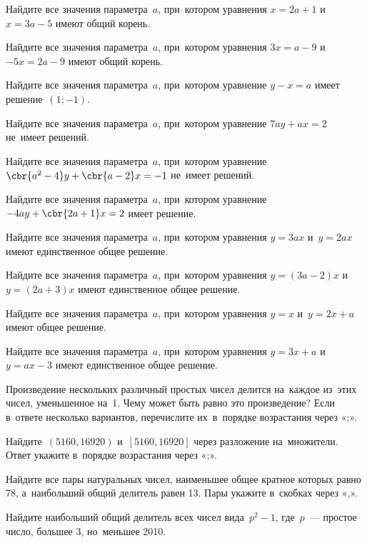  Найдите все значения параметра~$a$, при~котором уравнения
$x=2a+1$ и~$x=3a-5$ имеют общий корень.

 Найдите все значения параметра~$a$, при~котором уравнения
$3x=a-9$ и~$-5x=2a-9$ имеют общий корень.

 Найдите все значения параметра~$a$, при~котором уравнение
$y-x=a$ имеет решение~$(1;-1)$.

 Найдите все значения параметра~$a$, при~котором уравнение
$7ay+ax=2$ не~имеет решений.

 Найдите все значения параметра~$a$, при~котором уравнение
$\cbr{a^2-4}y+\cbr{a-2}x=-1$ не~имеет решений.

 Найдите все значения параметра~$a$, при~котором уравнение
$-4ay+\cbr{2a+1}x=2$ имеет решение.

 Найдите все значения параметра~$a$, при~котором уравнения
$y=3ax$ и~$y=2ax$ имеют единственное общее решение.

 Найдите все значения параметра~$a$, при~котором уравнения
$y=(3a-2)x$ и~$y=(2a+3)x$ имеют единственное общее решение.

 Найдите все значения параметра~$a$, при~котором уравнения
$y=x$ и~$y=2x+a$ имеют общее решение.

 Найдите все значения параметра~$a$, при~котором уравнения
$y=3x+a$ и~$y=ax-3$ имеют единственное общее решение.

Произведение нескольких различный простых чисел делится на~каждое из~этих чисел, уменьшенное на~1. Чему может быть равно это произведение?
Если в~ответе несколько вариантов, перечислите их~в~порядке возрастания через «;».

Найдите~$(5160, 16920)$ и~$[5160, 16920]$ через разложение на~множители.
Ответ укажите в~порядке возрастания через «;».

Найдите все пары натуральных чисел, наименьшее общее кратное которых равно 78, а~наибольший общий делитель равен 13.
Пары укажите в~скобках через «,».

Найдите наибольший общий делитель всех чисел вида~$p^2-1$, где~$p$~--- простое число, большее 3, но~меньшее 2010.

